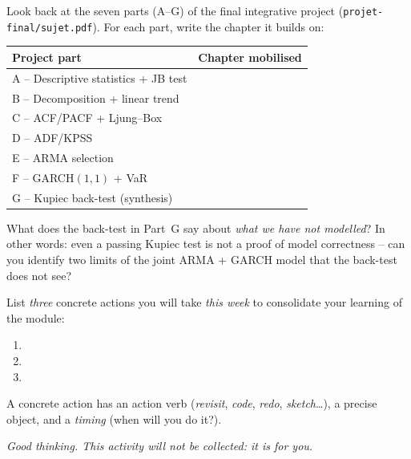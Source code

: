 \documentclass[a4paper,11pt]{article}
\begin{document}
\begin{question}
Look back at the seven parts (A--G) of the final integrative
project (\texttt{projet-final/sujet.pdf}). For each part, write the
chapter it builds on:

\medskip
\begin{tabular}{ll}
\toprule
\textbf{Project part} & \textbf{Chapter mobilised} \\
\midrule
A -- Descriptive statistics + JB test & \dotfill \\
B -- Decomposition + linear trend     & \dotfill \\
C -- ACF/PACF + Ljung--Box            & \dotfill \\
D -- ADF/KPSS                         & \dotfill \\
E -- ARMA selection                   & \dotfill \\
F -- GARCH$(1, 1)$ + VaR              & \dotfill \\
G -- Kupiec back-test (synthesis)     & \dotfill \\
\bottomrule
\end{tabular}

\medskip
What does the back-test in Part~G say about \emph{what we have
not modelled}? In other words: even a passing Kupiec test is not a
proof of model correctness -- can you identify two limits of the
joint ARMA + GARCH model that the back-test does not see?
\end{question}

\begin{question}
List \emph{three} concrete actions you will take \emph{this week}
to consolidate your learning of the module:
\begin{enumerate}
  \item \dotfill
  \item \dotfill
  \item \dotfill
\end{enumerate}
A concrete action has an action verb (\emph{revisit}, \emph{code},
\emph{redo}, \emph{sketch}\dots), a precise object, and a
\emph{timing} (when will you do it?).
\end{question}

\bigskip
\noindent\textit{Good thinking. This activity will not be
collected: it is for you.}\par\medskip
\hfill\auteurNom\par
\hfill\auteurEmail\par
\end{document}
